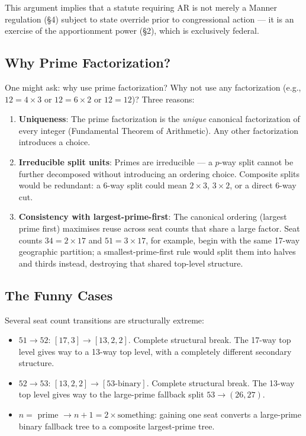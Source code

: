 This argument implies that a statute requiring AR is not merely a Manner
regulation (\S4) subject to state override prior to congressional action
--- it is an exercise of the apportionment power (\S2), which is exclusively
federal.

\subsection{Why Prime Factorization?}
\label{sec:discussion:why-primes}

One might ask: why use prime factorization? Why not use any factorization
(e.g., $12 = 4 \times 3$ or $12 = 6 \times 2$ or $12 = 12$)? Three reasons:

\begin{enumerate}
  \item \textbf{Uniqueness}: The prime factorization is the \emph{unique}
        canonical factorization of every integer (Fundamental Theorem of
        Arithmetic). Any other factorization introduces a choice.
  \item \textbf{Irreducible split units}: Primes are irreducible --- a $p$-way
        split cannot be further decomposed without introducing an ordering
        choice. Composite splits would be redundant: a $6$-way split could
        mean $2\times 3$, $3\times 2$, or a direct 6-way cut.
  \item \textbf{Consistency with largest-prime-first}: The canonical ordering
        (largest prime first) maximises reuse across seat counts that share a
        large factor. Seat counts $34 = 2\times 17$ and $51 = 3\times 17$,
        for example, begin with the same 17-way geographic partition; a
        smallest-prime-first rule would split them into halves and thirds
        instead, destroying that shared top-level structure.
\end{enumerate}

\subsection{The Funny Cases}
\label{sec:discussion:funny}

Several seat count transitions are structurally extreme:
\begin{itemize}
  \item $51 \to 52$: $[17, 3] \to [13, 2, 2]$. Complete structural break.
        The 17-way top level gives way to a 13-way top level, with a
        completely different secondary structure.
  \item $52 \to 53$: $[13, 2, 2] \to [53\text{-binary}]$. Complete structural
        break. The 13-way top level gives way to the large-prime fallback
        split $53 \to (26,27)$.
  \item $n = $ prime $\to n+1 = 2 \times \text{something}$: gaining one seat
        converts a large-prime binary fallback tree to a composite
        largest-prime tree.
\end{itemize}

